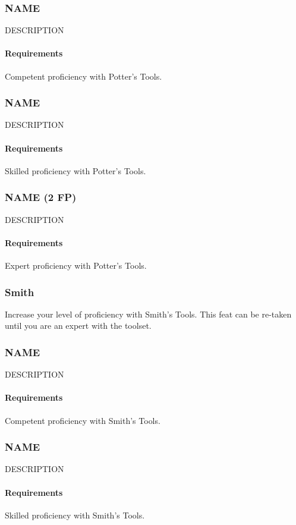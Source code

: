 \subsubsection{NAME} \label{feat::name}
    DESCRIPTION
    \paragraph{Requirements} Competent proficiency with Potter's Tools.
\subsubsection{NAME} \label{feat::name}
    DESCRIPTION
    \paragraph{Requirements} Skilled proficiency with Potter's Tools.
\subsubsection{NAME (2 FP)} \label{feat::name}
    DESCRIPTION
    \paragraph{Requirements} Expert proficiency with Potter's Tools.
\subsubsection{Smith} \label{feat::smith}
    Increase your level of proficiency with Smith's Tools.
    This feat can be re-taken until you are an expert with the toolset.
\subsubsection{NAME} \label{feat::name}
    DESCRIPTION
    \paragraph{Requirements} Competent proficiency with Smith's Tools.
\subsubsection{NAME} \label{feat::name}
    DESCRIPTION
    \paragraph{Requirements} Skilled proficiency with Smith's Tools.
